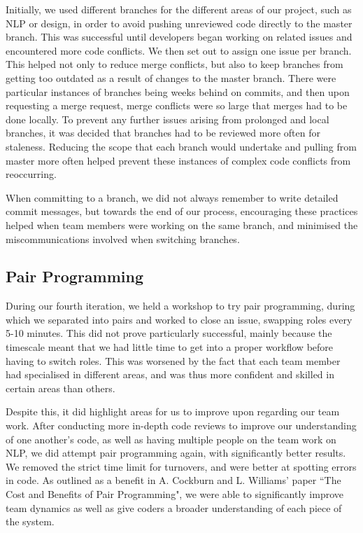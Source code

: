 \documentclass{l3proj}
\begin{document}
Initially, we used different branches for the different areas of our project, such as NLP or design, in order to avoid pushing unreviewed code directly to the master branch. This was successful until developers began working on related issues and encountered more code conflicts. We then set out to assign one issue per branch. This helped not only to reduce merge conflicts, but also to keep branches from getting too outdated as a result of changes to the master branch. There were particular instances of branches being weeks behind on commits, and then upon requesting a merge request, merge conflicts were so large that merges had to be done locally. To prevent any further issues arising from prolonged and local branches, it was decided that branches had to be reviewed more often for staleness. Reducing the scope that each branch would undertake and pulling from master more often helped prevent these instances of complex code conflicts from reoccurring.

When committing to a branch, we did not always remember to write detailed commit messages, but towards the end of our process, encouraging these practices helped when team members were working on the same branch, and minimised the miscommunications involved when switching branches.

\subsection{Pair Programming}

During our fourth iteration, we held a workshop to try pair programming, during which we separated into pairs and worked to close an issue, swapping roles every 5-10 minutes. This did not prove particularly successful, mainly because the timescale meant that we had little time to get into a proper workflow before having to switch roles. This was worsened by the fact that each team member had specialised in different areas, and was thus more confident and skilled in certain areas than others.

Despite this, it did highlight areas for us to improve upon regarding our team work. After conducting more in-depth code reviews to improve our understanding of one another's code, as well as having multiple people on the team work on NLP, we did attempt pair programming again, with significantly better results. We removed the strict time limit for turnovers, and were better at spotting errors in code. As outlined as a benefit in A. Cockburn and L. Williams' paper ``The Cost and Benefits of Pair Programming", we were able to significantly improve team dynamics as well as give coders a broader understanding of each piece of the system\cite{pairprog}.
\end{document}
